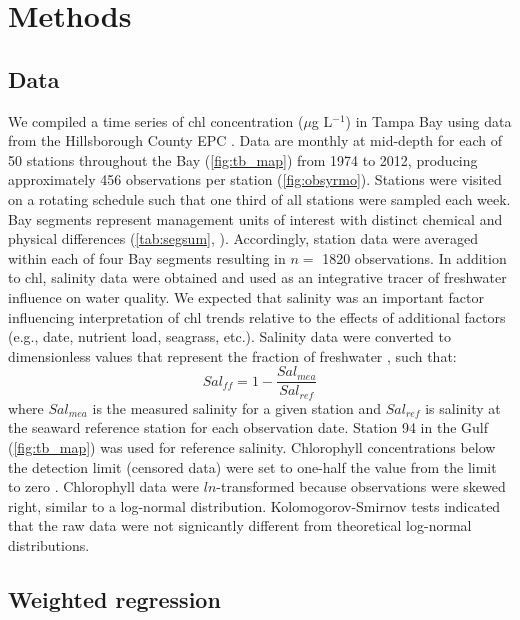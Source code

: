 \documentclass{svjour3}\usepackage[]{graphicx}\usepackage[]{color}
\newcommand{\mugl}{$\mu$g L$^{-1}$}
\begin{document}
\section{Methods}

\subsection{Data}

We compiled a time series of \ac{chl} concentration (\mugl) in Tampa Bay using data from the Hillsborough County \ac{EPC} \cite{TBEP11}.  Data are monthly at mid-depth for each of 50 stations throughout the Bay (\cref{fig:tb_map}) from 1974 to 2012, producing approximately 456 observations per station (\cref{fig:obsyrmo}).  Stations were visited on a rotating schedule such that one third of all stations were sampled each week.  Bay segments represent management units of interest with distinct chemical and physical differences (\cref{tab:segsum}, \cite{Lewis85}).  Accordingly, station data were averaged within each of four Bay segments resulting in $n=$ 1820 observations.  In addition to \ac{chl}, salinity data were obtained and used as an integrative tracer of freshwater influence on water quality.  We expected that salinity was an important factor influencing interpretation of \ac{chl} trends relative to the effects of additional factors (e.g., date, nutrient load, seagrass, etc.).  Salinity data were converted to dimensionless values that represent the fraction of freshwater \cite{Dyer73}, such that:
\begin{equation}
Sal_{ff} = 1 - \frac{Sal_{mea}}{Sal_{ref}}
\end{equation}
\noindent where $Sal_{mea}$ is the measured salinity for a given station and $Sal_{ref}$ is salinity at the seaward reference station for each observation date.  Station 94 in the Gulf (\cref{fig:tb_map}) was used for reference salinity.  Chlorophyll concentrations below the detection limit (censored data) were set to one-half the value from the limit to zero \cite{Gilbert87}.  Chlorophyll data were $ln$-transformed because observations were skewed right, similar to a log-normal distribution.  Kolomogorov-Smirnov tests indicated that the raw data were not signicantly different from theoretical log-normal distributions.

\subsection{Weighted regression}
\end{document}

